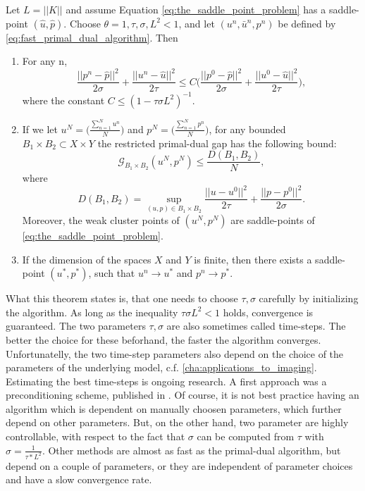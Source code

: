     \begin{theorem} %
    \label{the:primal_dual_convergence}
        Let $L = ||K||$ and assume Equation \ref{eq:the_saddle_point_problem} has a saddle-point $(\hat{u}, \hat{p})$. Choose $\theta = 1, \tau, \sigma, L^{2} < 1$, and let $(u^{n}, \bar{u}^{n}, p^{n})$ be defined by \ref{eq:fast_primal_dual_algorithm}. Then
            \begin{enumerate}
                \item For any n,
                    $$
                        \frac{||p^{n} - \hat{p}||^{2}}{2\sigma} + \frac{||u^{n} - \hat{u}||^{2}}{2\tau} \le C \bigg( \frac{||p^{0} - \hat{p}||^{2}}{2\sigma} + \frac{||u^{0} - \hat{u}||^{2}}{2\tau} \bigg),
                    $$
                where the constant $C \le (1 - \tau\sigma L^{2})^{-1}$.
                \item If we let $u^{N} = \bigg( \frac{\sum\limits_{n=1}^{N} u^{n}}{N} \bigg)$ and $p^{N} = \bigg( \frac{\sum\limits_{n=1}^{N} p^{n}}{N} \bigg)$, for any bounded $B_{1} \times B_{2} \subset X \times Y$ the restricted primal-dual gap has the following bound:
                    $$
                        \mathcal{G}_{B_{1} \times B_{2}}(u^{N}, p^{N}) \le \frac{D(B_{1}, B_{2})}{N},
                    $$
                where
                    $$
                        D(B_{1}, B_{2}) = \sup_{(u, p) \in B_{1} \times B_{2}} \frac{||u - u^{0}||^{2}}{2\tau} + \frac{||p - p^{0}||^{2}}{2\sigma}.
                    $$
                Moreover, the weak cluster points of $(u^{N}, p^{N})$ are saddle-points of \ref{eq:the_saddle_point_problem}.
                \item If the dimension of the spaces $X$ and $Y$ is finite, then there exists a saddle-point $(u^{\ast}, p^{\ast})$, such that $u^{n} \longrightarrow u^{\ast}$ and $p^{n} \longrightarrow p^{\ast}$.
            \end{enumerate}
    \end{theorem}

    \begin{remark}
        What this theorem states is, that one needs to choose $\tau, \sigma$ carefully by initializing the algorithm. As long as the inequality $\tau\sigma L^{2} < 1$ holds, convergence is guaranteed. The two parameters $\tau, \sigma$ are also sometimes called time-steps. The better the choice for these beforhand, the faster the algorithm converges. Unfortunatelly, the two time-step parameters also depend on the choice of the parameters of the underlying model, c.f. \ref{cha:applications_to_imaging}. Estimating the best time-steps is ongoing research. A first approach was a preconditioning scheme, published in \cite{Pock2011}. Of course, it is not best practice having an algorithm which is dependent on manually choosen parameters, which further depend on other parameters. But, on the other hand, two parameter are highly controllable, with respect to the fact that $\sigma$ can be computed from $\tau$ with $\sigma = \frac{1}{\tau * L^{2}}$. Other methods are almost as fast as the primal-dual algorithm, but depend on a couple of parameters, or they are independent of parameter choices and have a slow convergence rate.
    \end{remark}


